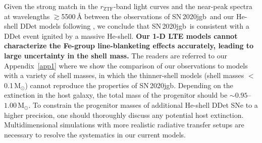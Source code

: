 \documentclass[twocolumn]{aastex631}
\newcommand{\sn}{SN\,2020jgb}
\newcommand{\Msun}{\mathrm{M_\odot}}
\newcommand{\revise}[1]{\textbf{#1}}
\begin{document}
Given the strong match in the $r_\mathrm{ZTF}$-band light curves and the near-peak spectra at wavelengths $\gtrsim$5500\,\r{A} between the observations of \sn\ and our He-shell DDet models following \citet{polin_observational_2019}, we conclude that \sn\ is consistent with a DDet event ignited by a massive He-shell. \revise{Our 1-D LTE models cannot characterize the Fe-group line-blanketing effects accurately, leading to large uncertainty in the shell mass.} The readers are referred to our Appendix~\ref{app1} where we show the comparison of our observations to models with a variety of shell masses, in which the thinner-shell models (shell masses $<$0.1\,$\Msun$) cannot reproduce the properties of \sn. Depending on the extinction in the host galaxy, the total mass of the progenitor should be $\sim$$0.95$--$1.00\,\Msun$. To constrain the progenitor masses of additional He-shell DDet SNe to a higher precision, one should thoroughly discuss any potential host extinction. Multidimensional simulations with more realistic radiative transfer setups are necessary to resolve the systematics in our current models.
\end{document}
